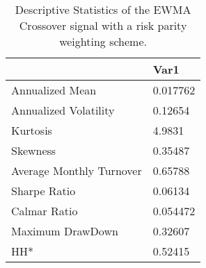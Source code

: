 \begin{table}[H]
\centering
\begin{tabular}{ll}
\hline& Var1 \\ 
\hline 
Annualized Mean & 0.017762 \\ 
Annualized Volatility & 0.12654 \\ 
Kurtosis & 4.9831 \\ 
Skewness & 0.35487 \\ 
Average Monthly Turnover & 0.65788 \\ 
Sharpe Ratio & 0.06134 \\ 
Calmar Ratio & 0.054472 \\ 
Maximum DrawDown & 0.32607 \\ 
HH* & 0.52415 \\ 
\hline
\end{tabular}
\caption{Descriptive Statistics of the EWMA Crossover signal with a risk parity weighting scheme.}
\label{MBBSRPNR}
\end{table}